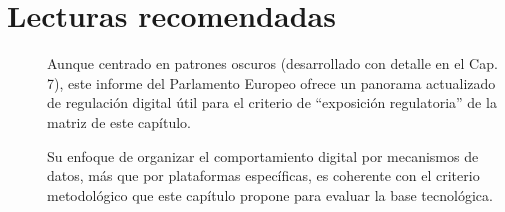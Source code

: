 \section{Lecturas recomendadas}

\begin{description}
  \item[\textcite{eprs2025darkpatterns}] Aunque centrado en patrones oscuros
  (desarrollado con detalle en el Cap. 7), este informe del Parlamento
  Europeo ofrece un panorama actualizado de regulación digital útil para el
  criterio de \enquote{exposición regulatoria} de la matriz de este
  capítulo.
  \item[\textcite{sheth2026}] Su enfoque de organizar el comportamiento
  digital por mecanismos de datos, más que por plataformas específicas, es
  coherente con el criterio metodológico que este capítulo propone para
  evaluar la base tecnológica.
\end{description}
